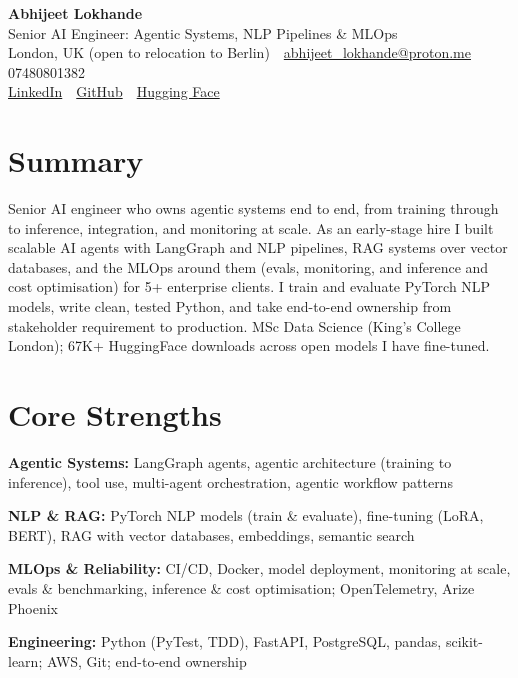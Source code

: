 \documentclass[10pt,a4paper]{article}
\newcommand{\sep}{\,\textcolor{accent!60}{\textbar}\,}
\begin{document}
\begin{center}
  {\fontsize{24}{26}\selectfont\bfseries Abhijeet Lokhande}\\[3pt]
  {\color{accent}\large Senior AI Engineer: Agentic Systems, NLP Pipelines \& MLOps}\\[5pt]
  {\small
    London, UK (open to relocation to Berlin) \sep
    \href{mailto:abhijeet_lokhande@proton.me}{abhijeet\_lokhande@proton.me} \sep
    07480801382 \\[2pt]
    \href{https://www.linkedin.com/in/ablds/}{LinkedIn} \sep
    \href{https://github.com/abhijeetscode}{GitHub} \sep
    \href{https://huggingface.co/ab-ai}{Hugging Face}
  }
\end{center}
\vspace{2pt}

\section{Summary}
Senior AI engineer who owns agentic systems end to end, from training through to inference, integration, and monitoring at scale. As an early-stage hire I built scalable AI agents with LangGraph and NLP pipelines, RAG systems over vector databases, and the MLOps around them (evals, monitoring, and inference and cost optimisation) for 5+ enterprise clients. I train and evaluate PyTorch NLP models, write clean, tested Python, and take end-to-end ownership from stakeholder requirement to production. MSc Data Science (King's College London); 67K+ HuggingFace downloads across open models I have fine-tuned.

\section{Core Strengths}
\begin{tight}
  \item[\textcolor{accent}{\small$\bullet$}] \textbf{Agentic Systems:} LangGraph agents, agentic architecture (training to inference), tool use, multi-agent orchestration, agentic workflow patterns
  \item[\textcolor{accent}{\small$\bullet$}] \textbf{NLP \& RAG:} PyTorch NLP models (train \& evaluate), fine-tuning (LoRA, BERT), RAG with vector databases, embeddings, semantic search
  \item[\textcolor{accent}{\small$\bullet$}] \textbf{MLOps \& Reliability:} CI/CD, Docker, model deployment, monitoring at scale, evals \& benchmarking, inference \& cost optimisation; OpenTelemetry, Arize Phoenix
  \item[\textcolor{accent}{\small$\bullet$}] \textbf{Engineering:} Python (PyTest, TDD), FastAPI, PostgreSQL, pandas, scikit-learn; AWS, Git; end-to-end ownership
\end{tight}
\end{document}
